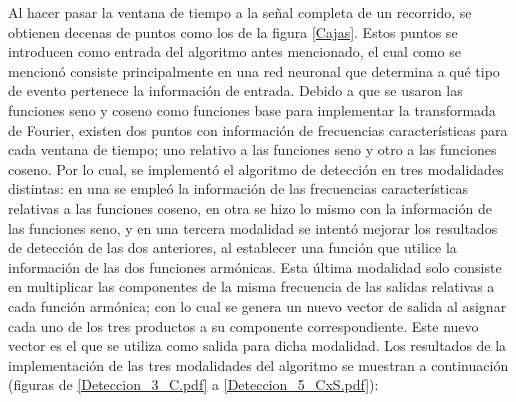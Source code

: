 Al hacer pasar la ventana de tiempo a la señal completa de un recorrido, se obtienen decenas de puntos como los de la figura \ref{Cajas}. 
Estos puntos se introducen como entrada del algoritmo antes mencionado, el cual como se mencionó consiste principalmente en una red neuronal que determina a qué tipo de evento pertenece la información de entrada.
Debido a que se usaron las funciones seno y coseno como funciones base para implementar la transformada de Fourier, existen dos puntos con información de frecuencias características para cada ventana de tiempo; uno relativo a las funciones seno y otro a las funciones coseno.
Por lo cual, se implementó el algoritmo de detección en tres modalidades distintas: en una se empleó la información de las frecuencias características relativas a las funciones coseno, en otra se hizo lo mismo con la información de las funciones seno, y en una tercera modalidad se intentó mejorar los resultados de detección de las dos anteriores, al establecer una función que utilice la información de las dos funciones armónicas.
Esta última modalidad solo consiste en multiplicar las componentes de la misma frecuencia de las salidas relativas a cada función armónica; con lo cual se genera un nuevo vector de salida al asignar cada uno de los tres productos a su componente correspondiente.
Este nuevo vector es el que se utiliza como salida para dicha modalidad.
Los resultados de la implementación de las tres modalidades del algoritmo se muestran a continuación (figuras de \ref{Deteccion_3_C.pdf} a \ref{Deteccion_5_CxS.pdf}):

\pagebreak
\ \\
\vspace{27cm}
\pagebreak
\ \\
\vspace{10.4cm}

\pagebreak
\ \\
\vspace{27cm}
\pagebreak
\ \\
\vspace{10.4cm}

